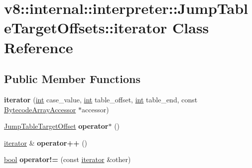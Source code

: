 \hypertarget{classv8_1_1internal_1_1interpreter_1_1JumpTableTargetOffsets_1_1iterator}{}\section{v8\+:\+:internal\+:\+:interpreter\+:\+:Jump\+Table\+Target\+Offsets\+:\+:iterator Class Reference}
\label{classv8_1_1internal_1_1interpreter_1_1JumpTableTargetOffsets_1_1iterator}
\subsection*{Public Member Functions}
\begin{DoxyCompactItemize}
\item 
\mbox{\label{classv8_1_1internal_1_1interpreter_1_1JumpTableTargetOffsets_1_1iterator_a4c6b6c6221cc442116b1d3ac4bd9ad3f}} 
{\bfseries iterator} (\mbox{\hyperlink{classint}{int}} case\+\_\+value, \mbox{\hyperlink{classint}{int}} table\+\_\+offset, \mbox{\hyperlink{classint}{int}} table\+\_\+end, const \mbox{\hyperlink{classv8_1_1internal_1_1interpreter_1_1BytecodeArrayAccessor}{Bytecode\+Array\+Accessor}} $\ast$accessor)
\item 
\mbox{\label{classv8_1_1internal_1_1interpreter_1_1JumpTableTargetOffsets_1_1iterator_aab3c3b1277eb2f1ff7317195190e463d}} 
\mbox{\hyperlink{structv8_1_1internal_1_1interpreter_1_1JumpTableTargetOffset}{Jump\+Table\+Target\+Offset}} {\bfseries operator$\ast$} ()
\item 
\mbox{\label{classv8_1_1internal_1_1interpreter_1_1JumpTableTargetOffsets_1_1iterator_a20784eea25a9d83df8e5ad07d82cdf4e}} 
\mbox{\hyperlink{classv8_1_1internal_1_1interpreter_1_1JumpTableTargetOffsets_1_1iterator}{iterator}} \& {\bfseries operator++} ()
\item 
\mbox{\label{classv8_1_1internal_1_1interpreter_1_1JumpTableTargetOffsets_1_1iterator_a63830f13e0dcc55715e4687d72d48164}} 
\mbox{\hyperlink{classbool}{bool}} {\bfseries operator!=} (const \mbox{\hyperlink{classv8_1_1internal_1_1interpreter_1_1JumpTableTargetOffsets_1_1iterator}{iterator}} \&other)
\end{DoxyCompactItemize}


